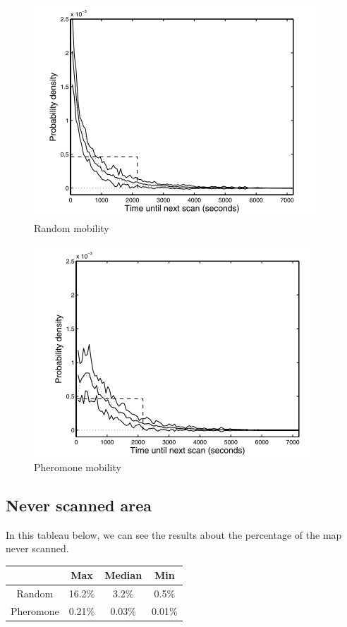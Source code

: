 \begin{figure}[!h]
\centering
   \includegraphics{../images/random_scan_characteristic.png}
\caption{\label{randomchar} Random mobility\cite{UAV}}
\end{figure}

\begin{figure}[!h]
   \centering
   \includegraphics{../images/pheromone_scan_characteristic.png}
\caption{\label{pheromonechar} Pheromone mobility\cite{UAV}}
\end{figure}

\subsection{Never scanned area}

In this tableau below, we can see the results about the percentage of the map never scanned.\\

\begin{center}
\begin{tabular}{|c|c|c|c|}
\hline
	      & Max & Median & Min \\
	      \hline
	Random & 16.2\% & 3.2\% & 0.5\% \\
	\hline
	Pheromone & 0.21\% & 0.03\% & 0.01\% \\
	\hline
\end{tabular}
\end{center}

